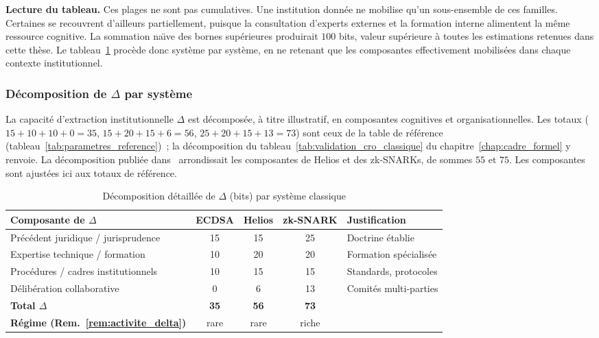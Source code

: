 \begin{sloppypar}
\noindent\textbf{Lecture du tableau.} Ces plages ne sont pas cumulatives. Une
institution donn\'ee ne mobilise qu'un sous-ensemble de ces familles. Certaines se
recouvrent d'ailleurs partiellement, puisque la consultation d'experts externes
et la formation interne alimentent la m\^eme ressource cognitive. La
sommation na\"{\i}ve des bornes sup\'erieures produirait $100$ bits, valeur
sup\'erieure \`a toutes les estimations retenues dans cette th\`ese. Le
tableau~\ref{tab:decomposition_delta} proc\`ede donc syst\`eme par syst\`eme,
en ne retenant que les composantes effectivement mobilis\'ees dans chaque
contexte institutionnel.

\subsubsection{D\'ecomposition de $\Delta$ par syst\`eme}
\label{subsec:decomposition_delta}

La capacit\'e d'extraction institutionnelle $\Delta$ est d\'ecompos\'ee, \`a titre
illustratif, en composantes cognitives et organisationnelles. Les totaux
($15+10+10+0 = 35$, $15+20+15+6 = 56$, $25+20+15+13 = 73$) sont ceux de la table
de r\'ef\'erence (tableau~\ref{tab:parametres_reference})~; la d\'ecomposition du
tableau~\ref{tab:validation_cro_classique} du chapitre~\ref{chap:cadre_formel} y renvoie. La d\'ecomposition publi\'ee dans~\cite{MINKA2026CRO} arrondissait les composantes de Helios et des zk-SNARKs, de sommes $55$ et $75$. Les composantes sont ajust\'ees ici aux totaux de r\'ef\'erence.

\begin{table}[htbp]
\centering
\caption{D\'ecomposition d\'etaill\'ee de $\Delta$ (bits) par syst\`eme classique}
\label{tab:decomposition_delta}
\begin{tabular}{@{}lcccl@{}}
\toprule
\textbf{Composante de $\Delta$} & \textbf{ECDSA} & \textbf{Helios} &
\textbf{zk-SNARK} & \textbf{Justification} \\
\midrule
Pr\'ec\'edent juridique / jurisprudence
  & 15 & 15 & 25
  & Doctrine \'etablie \\
Expertise technique / formation
  & 10 & 20 & 20
  & Formation sp\'ecialis\'ee \\
Proc\'edures / cadres institutionnels
  & 10 & 15 & 15
  & Standards, protocoles \\
D\'elib\'eration collaborative
  & 0 & 6 & 13
  & Comit\'es multi-parties \\
\midrule
\textbf{Total $\Delta$} & \textbf{35} & \textbf{56} & \textbf{73} & \\
\midrule
\textbf{R\'egime (Rem.~\ref{rem:activite_delta})} & rare & rare & riche & \\
\bottomrule
\end{tabular}


\end{table}
\end{sloppypar}
